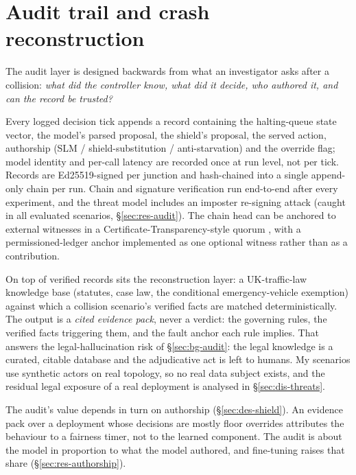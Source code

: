 \section{Audit trail and crash reconstruction}\label{sec:des-audit}
The audit layer is designed backwards from what an investigator asks
after a collision: \emph{what did the controller know, what did it
decide, who authored it, and can the record be trusted?}

Every logged decision tick appends a record containing the halting-queue
state vector, the model's parsed proposal, the shield's proposal, the served
action, authorship (SLM / shield-substitution / anti-starvation) and the
override flag; model identity and per-call latency are recorded once
at run level, not per tick. Records are Ed25519-signed per junction and
hash-chained into a single append-only chain per run. Chain and
signature verification run end-to-end after every experiment, and the
threat model includes an imposter re-signing attack (caught in all
evaluated scenarios, \S\ref{sec:res-audit}). The chain head can be anchored
to external witnesses in a Certificate-Transparency-style quorum
\cite{rfc6962}, with a permissioned-ledger anchor implemented as one
optional witness rather than as a contribution.

On top of verified records sits the reconstruction layer: a UK-traffic-law
knowledge base (statutes, case law, the conditional emergency-vehicle
exemption) against which a collision scenario's verified facts are
matched deterministically. The output is a \emph{cited evidence pack}, never
a verdict: the governing rules, the verified facts triggering them, and
the fault anchor each rule implies. That answers the legal-hallucination
risk \cite{dahl2024legal} of \S\ref{sec:bg-audit}: the legal
knowledge is a curated, citable database and the adjudicative act is left
to humans. My scenarios use synthetic actors on real
topology, so no real data subject exists, and the residual legal exposure
of a real deployment is analysed in \S\ref{sec:dis-threats}.

The audit's value depends in turn on authorship
(\S\ref{sec:des-shield}). An evidence pack over a deployment whose
decisions are mostly floor overrides attributes the behaviour to a
fairness timer, not to the learned component. The audit is about the
model in proportion to what the model authored, and fine-tuning raises
that share (\S\ref{sec:res-authorship}).

